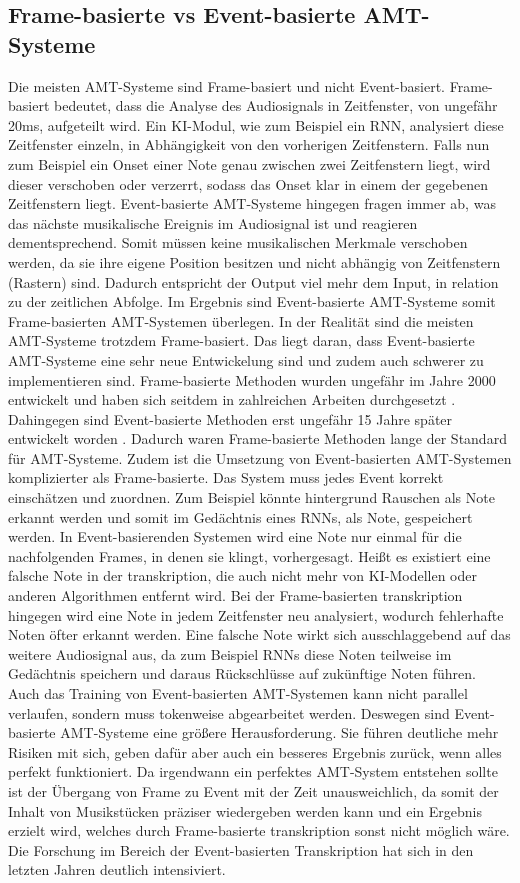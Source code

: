 \subsection{Frame-basierte vs Event-basierte AMT-Systeme}
Die meisten AMT-Systeme sind Frame-basiert und nicht Event-basiert.
Frame-basiert bedeutet, dass die Analyse des Audiosignals in Zeitfenster, von ungefähr 20ms, aufgeteilt wird.
Ein KI-Modul, wie zum Beispiel ein RNN, analysiert diese Zeitfenster einzeln,
in Abhängigkeit von den vorherigen Zeitfenstern.
Falls nun zum Beispiel ein Onset einer Note genau zwischen zwei Zeitfenstern liegt,
wird dieser verschoben oder verzerrt, sodass das Onset klar in einem der gegebenen Zeitfenstern liegt.
Event-basierte AMT-Systeme hingegen fragen immer ab,
was das nächste musikalische Ereignis im Audiosignal ist und reagieren dementsprechend.
Somit müssen keine musikalischen Merkmale verschoben werden,
da sie ihre eigene Position besitzen und nicht abhängig von Zeitfenstern (Rastern) sind.
Dadurch entspricht der Output viel mehr dem Input, in relation zu der zeitlichen Abfolge.
Im Ergebnis sind Event-basierte AMT-Systeme somit Frame-basierten AMT-Systemen überlegen.
In der Realität sind die meisten AMT-Systeme trotzdem Frame-basiert.
Das liegt daran, dass Event-basierte AMT-Systeme eine sehr neue Entwickelung sind
und zudem auch schwerer zu implementieren sind.
Frame-basierte Methoden wurden ungefähr im Jahre 2000 entwickelt
und haben sich seitdem in zahlreichen Arbeiten durchgesetzt \cite{Martin1996, klapuri1998automatic}.
Dahingegen sind Event-basierte Methoden erst ungefähr 15 Jahre später entwickelt worden \cite{performance_rnn2017event}.
Dadurch waren Frame-basierte Methoden lange der Standard für AMT-Systeme.
Zudem ist die Umsetzung von Event-basierten AMT-Systemen komplizierter als Frame-basierte.
Das System muss jedes Event korrekt einschätzen und zuordnen.
Zum Beispiel könnte hintergrund Rauschen als Note erkannt werden und somit im
Gedächtnis eines RNNs, als Note, gespeichert werden.
In Event-basierenden Systemen wird eine Note nur einmal für die nachfolgenden Frames, in denen sie klingt, vorhergesagt.
Heißt es existiert eine falsche Note in der transkription,
die auch nicht mehr von KI-Modellen oder anderen Algorithmen entfernt wird.
Bei der Frame-basierten transkription hingegen wird eine Note in jedem Zeitfenster neu analysiert,
wodurch fehlerhafte Noten öfter erkannt werden.
Eine falsche Note wirkt sich ausschlaggebend auf das weitere Audiosignal aus,
da zum Beispiel RNNs diese Noten teilweise im Gedächtnis speichern und daraus Rückschlüsse auf zukünftige Noten führen.
Auch das Training von Event-basierten AMT-Systemen kann nicht parallel verlaufen,
sondern muss tokenweise abgearbeitet werden.
Deswegen sind Event-basierte AMT-Systeme eine größere Herausforderung.
Sie führen deutliche mehr Risiken mit sich, geben dafür aber auch ein besseres Ergebnis zurück, wenn alles perfekt funktioniert.
Da irgendwann ein perfektes AMT-System entstehen sollte ist der Übergang von
Frame zu Event mit der Zeit unausweichlich, da somit der Inhalt von Musikstücken
präziser wiedergeben werden kann und ein Ergebnis erzielt wird,
welches durch Frame-basierte transkription sonst nicht möglich wäre.
Die Forschung im Bereich der Event-basierten Transkription hat sich in den letzten Jahren deutlich intensiviert.

